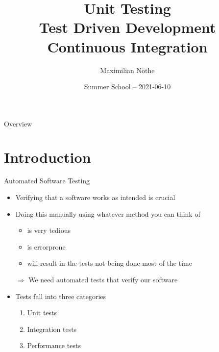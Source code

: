 
\author[M. Nöthe]{Maximilian Nöthe}
\title[Testing]{Unit Testing \\ Test Driven Development \\ Continuous Integration}
\date[2021-06-10]{%
  \Large Summer School – 2021-06-10
}


\maketitle

\begin{frame}[c]{Overview}
  \tableofcontents
\end{frame}

\copywarning{}

\section{Introduction}

\begin{frame}[c]{Automated Software Testing}
  \begin{itemize}
    \item Verifying that a software works as intended is crucial
    \item Doing this manually using whatever method you can think of
      \begin{itemize}
        \item is very tedious
        \item is errorprone
        \item will result in the tests not being done most of the time
      \end{itemize}
    \item[$\Rightarrow$] We need automated tests that verify our software
    \item Tests fall into three categories
      \begin{enumerate}
        \item Unit tests
        \item Integration tests
        \item Performance tests
      \end{enumerate}
  \end{itemize}
\end{frame}

